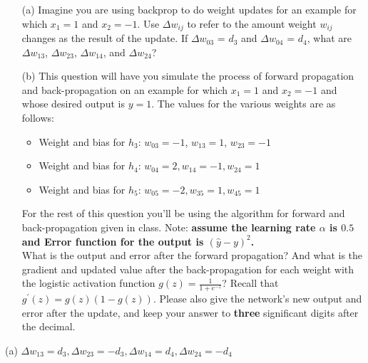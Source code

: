 \begin{itemize}
\item[(a)]Imagine you are using backprop to do weight updates for an example for which $x_1 = 1$ and $x_2 = -1$. Use $\Delta w_{ij}$ to refer to the amount weight $w_{ij}$ changes as the result of the update. If $\Delta w_{03}$ = $d_3$ and $\Delta w_{04}$ = $d_4$, what are $\Delta w_{13}$, $\Delta w_{23}$, $\Delta w_{14}$, and $\Delta w_{24}$? 

\item[(b)] This question will have you simulate the process of forward propagation and back-propagation on an example for which $x_1 = 1$ and $x_2 = -1$ and whose desired output is $y = 1$. The values for the various weights are as follows:
\begin{itemize}
\item Weight and bias for $h_3$: $w_{03} = -1$, $w_{13} = 1$, $w_{23} = -1$
\item Weight and bias for $h_4$: $w_{04} = 2, w_{14} = -1, w_{24} = 1$
\item Weight and bias for $h_5$: $w_{05} = -2, w_{35} = 1, w_{45} = 1$
\end{itemize}
For the rest of this question you'll be using the algorithm for forward and back-propagation given in class. Note: \textbf{assume the learning rate $\alpha$ is $0.5$ and Error function for the output is $(\hat{y}-y)^2$.}\\

What is the output and error after the forward propagation? And what is the gradient and updated value after the back-propagation for each weight with the logistic activation function $g(z)=\frac{1}{1+e^{-z}}$? Recall that $g^{\prime}(z)=g(z)(1-g(z))$. Please also give the network's new output and error after the update, and keep your answer to \textbf{three} significant digits after the decimal. 
\end{itemize}

\solution

(a) $\Delta w_{13} = d_3, \Delta w_{23} = -d_3, \Delta w_{14} = d_4, \Delta w_{24} = -d_4$

